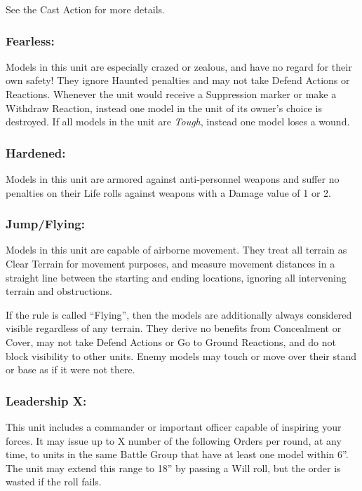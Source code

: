 \begin{multicols}{2}
See the Cast Action for more details.

\subsubsection*{Fearless:} Models in this unit are especially crazed or zealous, and have no regard for their own safety! They ignore Haunted penalties and may not take Defend Actions or Reactions. Whenever the unit would receive a Suppression marker or make a Withdraw Reaction, instead one model in the unit of its owner's choice is destroyed. If all models in the unit are \textit{Tough}, instead one model loses a wound.

\subsubsection*{Hardened:} Models in this unit are armored against anti-personnel weapons and suffer no penalties on their Life rolls against weapons with a Damage value of 1 or 2.

\subsubsection*{Jump/Flying:} Models in this unit are capable of airborne movement. They treat all terrain as Clear Terrain for movement purposes, and measure movement distances in a straight line between the starting and ending locations, ignoring all intervening terrain and obstructions.

If the rule is called ``Flying'', then the models are additionally always considered visible regardless of any terrain. They derive no benefits from Concealment or Cover, may not take Defend Actions or Go to Ground Reactions, and do not block visibility to other units. Enemy models may touch or move over their stand or base as if it were not there.

\subsubsection*{Leadership X:} This unit includes a commander or important officer capable of inspiring your forces. It may issue up to X number of the following Orders per round, at any time, to units in the same Battle Group that have at least one model within 6''. The unit may extend this range to 18'' by passing a Will roll, but the order is wasted if the roll fails.


\end{multicols}
